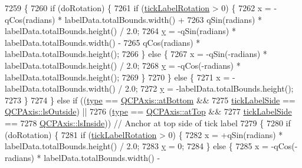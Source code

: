 \begin{DoxyCode}
7259   \{
7260     \textcolor{keywordflow}{if} (doRotation) \{
7261       \textcolor{keywordflow}{if} (\hyperlink{class_q_c_p_axis_painter_private_ae6ade9232a8e400924009e8edca94bac}{tickLabelRotation} > 0) \{
7262         x = -qCos(radians) * labelData.totalBounds.width() +
7263             qSin(radians) * labelData.totalBounds.height() / 2.0;
7264         \hyperlink{_comparision_pictures_2_createtest_image_8m_a2fb1c5cf58867b5bbc9a1b145a86f3a0}{y} = -qSin(radians) * labelData.totalBounds.width() -
7265             qCos(radians) * labelData.totalBounds.height();
7266       \} \textcolor{keywordflow}{else} \{
7267         x = -qSin(-radians) * labelData.totalBounds.height() / 2.0;
7268         \hyperlink{_comparision_pictures_2_createtest_image_8m_a2fb1c5cf58867b5bbc9a1b145a86f3a0}{y} = -qCos(-radians) * labelData.totalBounds.height();
7269       \}
7270     \} \textcolor{keywordflow}{else} \{
7271       x = -labelData.totalBounds.width() / 2.0;
7272       \hyperlink{_comparision_pictures_2_createtest_image_8m_a2fb1c5cf58867b5bbc9a1b145a86f3a0}{y} = -labelData.totalBounds.height();
7273     \}
7274   \} \textcolor{keywordflow}{else} \textcolor{keywordflow}{if} ((\hyperlink{class_q_c_p_axis_painter_private_ae04594e97417336933d807c86d353098}{type} == \hyperlink{class_q_c_p_axis_ae2bcc1728b382f10f064612b368bc18aa220d68888516b6c3b493d144f1ba438f}{QCPAxis::atBottom} &&
7275               \hyperlink{class_q_c_p_axis_painter_private_a9d27f7625fcfbeb3a60193d0c18fc7e9}{tickLabelSide} == \hyperlink{class_q_c_p_axis_a24b13374b9b8f75f47eed2ea78c37db9a2eadb509fc0c9a8b35b85c86ec9f3c7a}{QCPAxis::lsOutside}) ||
7276              (\hyperlink{class_q_c_p_axis_painter_private_ae04594e97417336933d807c86d353098}{type} == \hyperlink{class_q_c_p_axis_ae2bcc1728b382f10f064612b368bc18aac0ece2b680d3f545e701f75af1655977}{QCPAxis::atTop} &&
7277               \hyperlink{class_q_c_p_axis_painter_private_a9d27f7625fcfbeb3a60193d0c18fc7e9}{tickLabelSide} ==
7278                   \hyperlink{class_q_c_p_axis_a24b13374b9b8f75f47eed2ea78c37db9aae7b027ac2839cf4ad611df30236fc3f}{QCPAxis::lsInside})) \textcolor{comment}{// Anchor at top side of tick label}
7279   \{
7280     \textcolor{keywordflow}{if} (doRotation) \{
7281       \textcolor{keywordflow}{if} (\hyperlink{class_q_c_p_axis_painter_private_ae6ade9232a8e400924009e8edca94bac}{tickLabelRotation} > 0) \{
7282         x = +qSin(radians) * labelData.totalBounds.height() / 2.0;
7283         \hyperlink{_comparision_pictures_2_createtest_image_8m_a2fb1c5cf58867b5bbc9a1b145a86f3a0}{y} = 0;
7284       \} \textcolor{keywordflow}{else} \{
7285         x = -qCos(-radians) * labelData.totalBounds.width() -

\end{DoxyCode}
